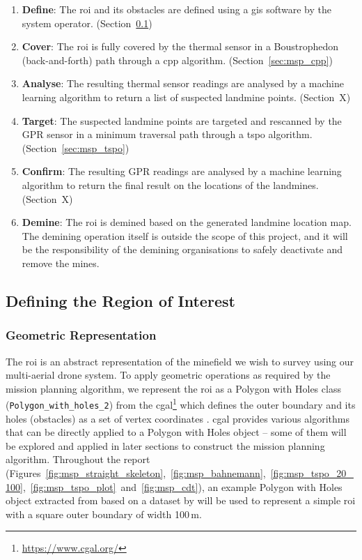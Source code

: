 \begin{enumerate}
    \item \textbf{Define}: The \gls{roi} and its obstacles are defined using a \gls{gis} software by the system operator. (Section~\ref{sec:msp_define})
    \item \textbf{Cover}: The \gls{roi} is fully covered by the thermal sensor in a Boustrophedon (back-and-forth) path through a \gls{cpp} algorithm. (Section~\ref{sec:msp_cpp})
    \item \textbf{Analyse}: The resulting thermal sensor readings are analysed by a machine learning algorithm to return a list of suspected landmine points. (Section~X) 
    \item \textbf{Target}: The suspected landmine points are targeted and rescanned by the \gls{GPR} sensor in a minimum traversal path through a \gls{tspo} algorithm. (Section~\ref{sec:msp_tspo}) 
    \item \textbf{Confirm}: The resulting \gls{GPR} readings are analysed by a machine learning algorithm to return the final result on the locations of the landmines. (Section~X)
    \item \textbf{Demine}: The \gls{roi} is demined based on the generated landmine location map. The demining operation itself is outside the scope of this project, and it will be the responsibility of the demining organisations to safely deactivate and remove the mines.
\end{enumerate}


\subsection{Defining the Region of Interest}
\label{sec:msp_define}

\subsubsection{Geometric Representation}

The \gls{roi} is an abstract representation of the minefield we wish to survey using our multi-aerial drone system. To apply geometric operations as required by the mission planning algorithm, we represent the \gls{roi} as a Polygon with Holes class (\texttt{Polygon\_with\_holes\_2}) from the \gls{cgal}\footnote{\url{https://www.cgal.org/}} which defines the outer boundary and its holes (obstacles) as a set of vertex coordinates \cite{cgal2024pwh}. \gls{cgal} provides various algorithms that can be directly applied to a Polygon with Holes object -- some of them will be explored and applied in later sections to construct the mission planning algorithm. Throughout the report (Figures~\ref{fig:msp_straight_skeleton},~\ref{fig:msp_bahnemann},~\ref{fig:msp_tspo_20_100},~\ref{fig:msp_tspo_plot}~and~\ref{fig:msp_cdt}), an example Polygon with Holes object extracted from \cite{bahnemann2021cpp} based on a dataset by \cite{sun2014dataset} will be used to represent a simple \gls{roi} with a square outer boundary of width 100\,m. 

